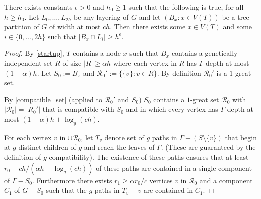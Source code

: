 \documentclass{patmorin}
\begin{document}
\begin{lem}
  There exists constants $\epsilon >0$ and $h_0\ge 1$ such that the following is true, for all $h \ge h_0$.  Let $L_0,\ldots,L_{2h}$ be any layering of $G$ and let $(B_x:x\in V(T))$ be a tree partition of $G$ of width at most $ch$.  Then there exists some $x\in V(T)$ and some $i\in\{0,\ldots,2h\}$ such that $|B_x\cap L_i| \ge h^{\epsilon}$.
\end{lem}

\begin{proof}
  By \cref{startup}, $T$ contains a node $x$ such that $B_x$ contains a genetically independent set $R$ of size $|R|\ge \alpha h$ where each vertex in $R$ has $\Gamma$-depth at most $(1-\alpha)h$.  Let $S_0:=B_x$ and $\mathcal{R}_0':=\{\{v\}:v\in R\}$.  By definition $\mathcal{R}_0'$ is a $1$-great set.



  By \cref{compatible_set} (applied to $\mathcal{R}_0'$ and $S_0$) $S_0$ contains a $1$-great set $\mathcal{R}_0$ with $|\mathcal{R}_0|=|R_0'|$ that is compatible with $S_0$ and in which every vertex has $\Gamma$-depth at most $(1-\alpha)h+\log_g(ch)$.

  For each vertex $v$ in $\cup\mathcal{R}_0$, let $T_v$ denote set of $g$ paths in $\Gamma-(S\setminus\{v\})$ that begin at $g$ distinct children of $g$ and reach the leaves of $\Gamma$.  (These are guaranteed by the definition of $g$-compatibility).  The existence of these paths ensures that at least $r_0-ch/(\alpha h - \log_g(ch))$ of these paths are contained in a single component of $\Gamma-S_0$.  Furthermore there exists $r_1\ge \alpha r_0/c$ vertices $v$ in $\mathcal{R}_0$ and a component $C_1$ of $G-S_0$ such that the $g$ paths in $T_v-v$ are contained in $C_1$.  


\end{proof}
\end{document}
